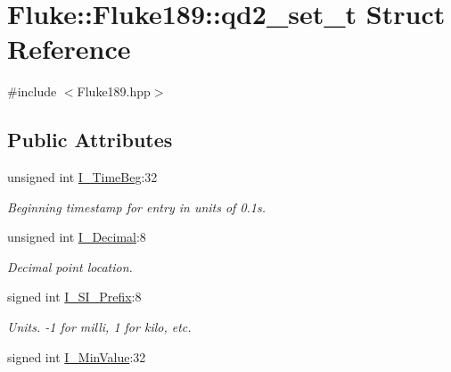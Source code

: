 \hypertarget{structFluke_1_1Fluke189_1_1qd2__set__t}{
\section{Fluke::Fluke189::qd2\_\-set\_\-t Struct Reference}
\label{structFluke_1_1Fluke189_1_1qd2__set__t}
}


{\ttfamily \#include $<$Fluke189.hpp$>$}\subsection*{Public Attributes}
\begin{DoxyCompactItemize}
\item 
\hypertarget{structFluke_1_1Fluke189_1_1qd2__set__t_ad5d35f66cd39c8e81fa530bd5961cafa}{
unsigned int \hyperlink{structFluke_1_1Fluke189_1_1qd2__set__t_ad5d35f66cd39c8e81fa530bd5961cafa}{I\_\-TimeBeg}:32}
\label{structFluke_1_1Fluke189_1_1qd2__set__t_ad5d35f66cd39c8e81fa530bd5961cafa}

\begin{DoxyCompactList}\small\item\em Beginning timestamp for entry in units of 0.1s. \item\end{DoxyCompactList}\item 
\hypertarget{structFluke_1_1Fluke189_1_1qd2__set__t_a69baa0b996d4ce66d6059e4e1d0b807a}{
unsigned int \hyperlink{structFluke_1_1Fluke189_1_1qd2__set__t_a69baa0b996d4ce66d6059e4e1d0b807a}{I\_\-Decimal}:8}
\label{structFluke_1_1Fluke189_1_1qd2__set__t_a69baa0b996d4ce66d6059e4e1d0b807a}

\begin{DoxyCompactList}\small\item\em Decimal point location. \item\end{DoxyCompactList}\item 
\hypertarget{structFluke_1_1Fluke189_1_1qd2__set__t_a9bf110d1b46dc0f6757b192be616d0f7}{
signed int \hyperlink{structFluke_1_1Fluke189_1_1qd2__set__t_a9bf110d1b46dc0f6757b192be616d0f7}{I\_\-SI\_\-Prefix}:8}
\label{structFluke_1_1Fluke189_1_1qd2__set__t_a9bf110d1b46dc0f6757b192be616d0f7}

\begin{DoxyCompactList}\small\item\em Units. -\/1 for milli, 1 for kilo, etc. \item\end{DoxyCompactList}\item 
\hypertarget{structFluke_1_1Fluke189_1_1qd2__set__t_a3f91933041945b6ebacdb3b032a45f1b}{
signed int \hyperlink{structFluke_1_1Fluke189_1_1qd2__set__t_a3f91933041945b6ebacdb3b032a45f1b}{I\_\-MinValue}:32}
\label{structFluke_1_1Fluke189_1_1qd2__set__t_a3f91933041945b6ebacdb3b032a45f1b}


\end{DoxyCompactItemize}
